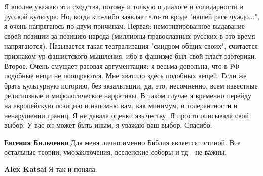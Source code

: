 \begin{itemize}
\begin{itemize}
Я вполне уважаю эти сходства, потому и толкую о диалоге и солидарности в
русской культуре. Но, когда кто-либо заявляет что-то вроде "нашей расе
чуждо...", я очень напрягаюсь по двум причинам. Первая: немотивированное
выдавание своей позиции за позицию народа (миллионы православных русских в это
время напрягаются). Называется такая театрализация "синдром общих своих",
считается признаком ур-фашистского мышления, ибо в фашизме был свой пласт
эзотерики. Второе. Очень смущает расовая аргументация: я весьма довольна, что в
РФ подобные вещи не поощряются. Мне хватило здесь подобных вещей. Если же брать
культурную историю, без экзальтации, да, это, несомненно, всем известные
религиозные и мифологические нарративы. В таком случае я временно перейду на
европейскую позицию и напомню вам, как минимум, о толерантности и ненарушении
границ. Я не давала оценки язычеству. Я просто описывала свой выбор. У вас он
может быть иным, я уважаю ваш выбор. Спасибо.


 
\textbf{Евгения Бильченко} Для меня лично именно Библия является истиной. Все остальные теории, умозаключения, вселенские соборы и тд - не важны.

 
\textbf{Alex Katsai} Я так и поняла.

\end{itemize}

\end{itemize}

